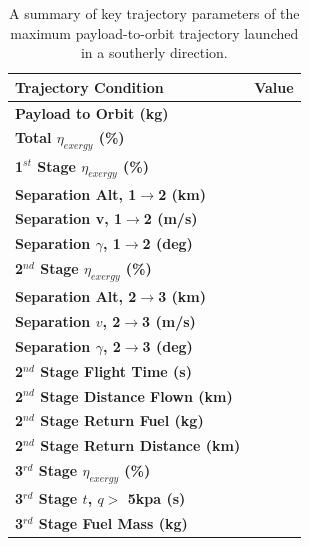\begin{table}
	\centering
	\begin{tabular}{l c} 
		\hline \textbf{Trajectory Condition}
		& Value

		\\
		\hline \textbf{Payload to Orbit (kg)}
		& \textbf{\PayloadToOrbitAlternate}
		\\
		\textbf{Total $\eta_{exergy}$ (\%)}
		& \textbf{\totalExergyEffAlternate}
		\\
		\hline 
		\textbf{1$^{st}$ Stage $\eta_{exergy}$ (\%)}
		& \textbf{\firstExergyEffAlternate}
		\\
		\textbf{Separation Alt, 1$\rightarrow$2 (km)}
		& \firstsecondSeparationAltAlternate
		\\
		\textbf{Separation v, 1$\rightarrow$2 (m/s)}
		& \firstsecondSeparationvAlternate
		\\
		\textbf{Separation $\gamma$, 1$\rightarrow$2 (deg)}
		& \firstsecondSeparationgammaAlternate
		\\
		\hline 
		\textbf{2$^{nd}$ Stage $\eta_{exergy}$ (\%)}
		& \textbf{\secondExergyEffAlternate}
		\\
		\textbf{Separation Alt, 2$\rightarrow$3 (km)}
		& \secondthirdSeparationAltAlternate
		\\
		\textbf{Separation $v$, 2$\rightarrow$3 (m/s)}
		& \secondthirdSeparationvAlternate
		\\
		\textbf{Separation $\gamma$, 2$\rightarrow$3 (deg)}
		& \secondthirdSeparationgammaAlternate
		\\
		\textbf{2$^{nd}$ Stage Flight Time (s)}
		& \secondFlightTimeAlternate
		\\
		\textbf{2$^{nd}$ Stage Distance Flown (km)}
		& \SecondDistAlternate
		\\
		\textbf{2$^{nd}$ Stage Return Fuel (kg)}
		& \returnFuelAlternate
		\\
		\textbf{2$^{nd}$ Stage Return Distance (km)}
		& \returnDistAlternate
		\\
		\hline 
		\textbf{3$^{rd}$ Stage $\eta_{exergy}$ (\%)}
		& \textbf{\thirddExergyEffAlternate}
		\\
		\textbf{3$^{rd}$ Stage $t$, $q >$ 5kpa (s)}
		& \thirdqOverFiveAlternate
		\\
		\textbf{3$^{rd}$ Stage Fuel Mass (kg)}
		& \thirdmFuelAlternate
		\\
		\hline 
	\end{tabular} 
	\caption{A summary of key trajectory parameters of the maximum payload-to-orbit trajectory launched in a southerly direction.}
	\label{tab:summaryalternate}
\end{table}




